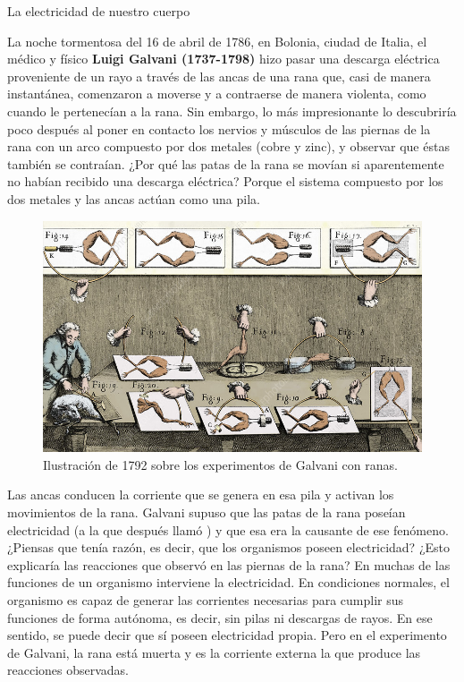 \begin{sectionbox}{La electricidad de nuestro cuerpo}
    \begin{minipage}{0.35\textwidth}
        La noche tormentosa del 16 de abril de 1786, en Bolonia, ciudad de Italia, el médico y físico
        \textbf{Luigi Galvani (1737-1798)} hizo pasar una descarga eléctrica proveniente de un rayo a través de las ancas de una rana que, casi
        de manera instantánea, comenzaron a moverse y a contraerse
        de manera violenta, como cuando le pertenecían a la rana.
        Sin embargo, lo más impresionante lo descubriría poco después al poner en contacto los nervios y músculos de las piernas
        de la rana con un arco compuesto por dos metales (cobre y zinc),
        y observar que éstas también se contraían. ¿Por qué las patas de la rana se movían si aparentemente no
        habían recibido una descarga eléctrica? Porque el sistema compuesto por los dos metales y las ancas actúan como una
        pila.
    \end{minipage}\hfill
    \begin{minipage}{0.6\textwidth}
        \begin{figure}[H]
            \centering
            \includegraphics[width=0.95\linewidth]{../images/galvani01}
            \caption{Ilustración de 1792 sobre los experimentos de Galvani con ranas.}
            \label{fig:galvani01}
        \end{figure}
    \end{minipage}

    Las ancas conducen la corriente que se genera en esa pila y activan los
    movimientos de la rana. Galvani supuso que las patas de la rana poseían electricidad
    (a la que después llamó ) y que esa era
    la causante de ese fenómeno. ¿Piensas que tenía razón, es
    decir, que los organismos poseen electricidad? ¿Esto explicaría las reacciones que observó en las piernas de la rana?
    En muchas de las funciones de un organismo interviene la electricidad. En condiciones normales, el organismo es capaz de generar las corrientes necesarias
    para cumplir sus funciones de forma autónoma, es decir, sin pilas ni descargas de
    rayos. En ese sentido, se puede decir que sí poseen electricidad propia. Pero en
    el experimento de Galvani, la rana está muerta y es la corriente externa la que
    produce las reacciones observadas.


\end{sectionbox}

